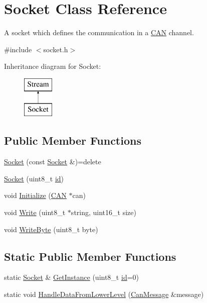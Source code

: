 \hypertarget{class_socket}{}\section{Socket Class Reference}
\label{class_socket}


A socket which defines the communication in a \hyperlink{class_c_a_n}{C\+AN} channel.  




{\ttfamily \#include $<$socket.\+h$>$}

Inheritance diagram for Socket\+:\begin{figure}[H]
\begin{center}
\leavevmode
\includegraphics[height=2.000000cm]{class_socket}
\end{center}
\end{figure}
\subsection*{Public Member Functions}
\begin{DoxyCompactItemize}
\item 
\hyperlink{class_socket_aae1f09b930bb7118172baa0abb15543e}{Socket} (const \hyperlink{class_socket}{Socket} \&)=delete
\item 
\hyperlink{class_socket_a19d60fe2466026642fcb0ccabe298dc2}{Socket} (uint8\+\_\+t \hyperlink{class_socket_a1cbe7e5484756b0852a3e2a201341dca}{id})
\item 
void \hyperlink{class_socket_a2039f4408295019f309d7cdffa36c744}{Initialize} (\hyperlink{class_c_a_n}{C\+AN} $\ast$can)
\item 
void \hyperlink{class_socket_a356ea1b27dbcb15324a4c8aaf85e5ed9}{Write} (uint8\+\_\+t $\ast$string, uint16\+\_\+t size)
\item 
void \hyperlink{class_socket_a548abd20eea1430230a77829e99c818a}{Write\+Byte} (uint8\+\_\+t byte)
\end{DoxyCompactItemize}
\subsection*{Static Public Member Functions}
\begin{DoxyCompactItemize}
\item 
static \hyperlink{class_socket}{Socket} \& \hyperlink{class_socket_abd7d51c20995473a9c9bd6c4e0e5d7c0}{Get\+Instance} (uint8\+\_\+t \hyperlink{class_socket_a1cbe7e5484756b0852a3e2a201341dca}{id}=0)
\item 
static void \hyperlink{class_socket_a2ed22a72d5b79a2b82cff935cd508e01}{Handle\+Data\+From\+Lower\+Level} (\hyperlink{struct_can_message}{Can\+Message} \&message)
\end{DoxyCompactItemize}
